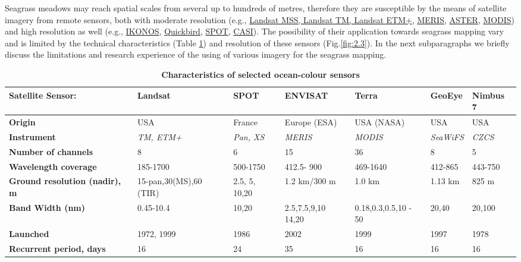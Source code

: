 \documentclass[10pt, a4paper]{article}
\begin{document}
Seagrass meadows may reach spatial scales from several up to hundreds of metres, therefore they are
susceptible by the means of satellite imagery from remote sensors, both with moderate resolution
(e.g., \href{http://landsat.gsfc.nasa.gov/}{Landsat MSS, Landsat TM, Landsat ETM+}, \href{http://envisat.esa.int/instruments/meris/}{MERIS}, \href{http://asterweb.jpl.nasa.gov/}{ASTER}, \href{http://modis.gsfc.nasa.gov/}{MODIS}) and high resolution as
well (e.g., \href{http://www.satimagingcorp.com/gallery-ikonos.html}{IKONOS}, \href{http://www.digitalglobe.com/index.php/85/QuickBird}{Quickbird}, \href{http://www.spotimage.fr/}{SPOT}, \href{http://www.itres.com/products/imagers/casi550}{CASI}). The possibility of their application towards seagrass mapping
vary and is limited by the technical characteristics (Table \ref{tab:1}) and resolution of these sensors  (Fig.\ref{fig:2.3}). In the next subparagraphs
we briefly discuss the limitations and research experience of the using of various imagery
for the seagrass mapping.

\begin{table}[htbp]
	\caption{\textbf{Characteristics of selected ocean-colour sensors}}
	\begin{center}
		\begin{tabular}{|p{2cm}|p{20mm}|p{15mm}|p{17mm}|p{15mm}|p{15mm}|p{15mm}|}
			\hline\hline
			\textbf{Satellite Sensor:} & {\textbf{Landsat}} & {\textbf{SPOT}} & {\textbf{ENVISAT}} & {\textbf{Terra}} & {\textbf{GeoEye}} & {\textbf{Nimbus 7}} \\ \hline\hline
				\textbf{Origin} & USA & France & Europe (ESA) & USA (NASA) & USA & USA \\ \hline
				\textbf{Instrument} & \textit{TM, ETM+} & \textit{Pan, XS} & \textit{MERIS} & \textit{MODIS} & \textit{SeaWiFS} & \textit{CZCS}\\ \hline
			\textbf{Number of channels} & 8 & 6 & 15 & 36 & 8 & 5 \\ \hline
			\textbf{Wavelength coverage} & 185-1700 & 500-1750 & 412.5- 900 & 469-1640 & 412-865 & 443-750 \\ \hline
			\textbf{Ground resolution (nadir), m} & 15-pan,30(MS),60 (TIR) & 2.5, 5, 10,20 & 1.2 km/300 m & 1.0 km & 1.13 km & 825 m \\ \hline
			\textbf{Band Width (nm)} & 0.45-10.4 & 10,20 & 2.5,7.5,9,10 14,20 & 0.18,0.3,0.5,10 - 50 & 20,40 & 20,100 \\ \hline
			\textbf{Launched} & 1972, 1999 & 1986 & 2002 & 1999 & 1997 & 1978 \\ \hline
			\textbf{Recurrent period, days} & 16 & 24 & 35 & 16 & 16 & 16 \\ \hline
		\end{tabular}
	\end{center}
	\label{tab:1}
\end{table}
\end{document}
